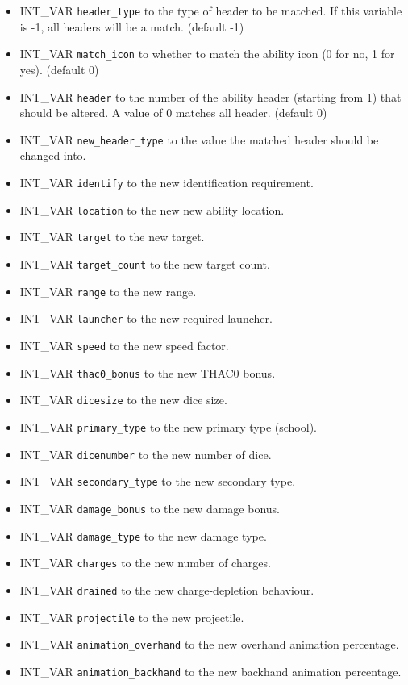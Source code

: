 \documentclass{article}
\begin{document}
\begin{itemize}
\item INT_VAR \verb+header_type+ to the type of header to be matched. If this variable is -1, all headers will be a match. (default -1)
\item INT_VAR \verb+match_icon+ to whether to match the ability icon (0 for no, 1 for yes). (default 0)
\item INT_VAR \verb+header+ to the number of the ability header (starting from 1) that should be altered. A value of 0 matches all header. (default 0)
\item INT_VAR \verb+new_header_type+ to the value the matched header should be changed into.
\item INT_VAR \verb+identify+ to the new identification requirement.
\item INT_VAR \verb+location+ to the new new ability location.
\item INT_VAR \verb+target+ to the new target.
\item INT_VAR \verb+target_count+ to the new target count.
\item INT_VAR \verb+range+ to the new range.
\item INT_VAR \verb+launcher+ to the new required launcher.
\item INT_VAR \verb+speed+ to the new speed factor.
\item INT_VAR \verb+thac0_bonus+ to the new THAC0 bonus.
\item INT_VAR \verb+dicesize+ to the new dice size.
\item INT_VAR \verb+primary_type+ to the new primary type (school).
\item INT_VAR \verb+dicenumber+ to the new number of dice.
\item INT_VAR \verb+secondary_type+ to the new secondary type.
\item INT_VAR \verb+damage_bonus+ to the new damage bonus.
\item INT_VAR \verb+damage_type+ to the new damage type.
\item INT_VAR \verb+charges+ to the new number of charges.
\item INT_VAR \verb+drained+ to the new charge-depletion behaviour.
\item INT_VAR \verb+projectile+ to the new projectile.
\item INT_VAR \verb+animation_overhand+ to the new overhand animation percentage.
\item INT_VAR \verb+animation_backhand+ to the new backhand animation percentage.

\end{itemize}
\end{document}
